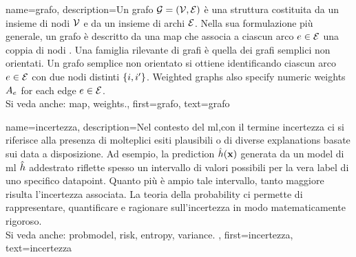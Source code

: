 {name={grafo},
	description={Un grafo $\mathcal{G} = \left( \mathcal{V},\mathcal{E} \right)$ è una struttura costituita da  
	un insieme di nodi $\mathcal{V}$ e da un insieme di archi $\mathcal{E}$. Nella sua formulazione più generale, 
	un grafo è descritto da una \gls{map} che associa a ciascun arco $e \in \mathcal{E}$ una coppia di nodi 
	\cite{RockNetworks}. 
		Una famiglia rilevante di grafi è quella dei grafi semplici non orientati. Un grafo semplice 
		non orientato si ottiene identificando ciascun arco $e \in \mathcal{E}$ con due nodi distinti $\{i,i'\}$. 
		Weighted graphs also specify numeric \gls{weights} $A_{e}$ for each 
		edge $e \in \mathcal{E}$.
					\\ 
		Si veda anche: \gls{map}, \gls{weights}.},
	first={grafo},
	text={grafo} 
}

{name={incertezza},
	description={Nel contesto del \gls{ml},con il termine incertezza ci si riferisce alla presenza di 
	molteplici esiti plausibili o di diverse \glspl{explanation} basate sui \gls{data} a disposizione. Ad esempio, la
		\gls{prediction} $\hat{h}({\bf x})$ generata da un \gls{model} di \gls{ml} 
		$\hat{h}$ addestrato riflette spesso un intervallo di valori possibili per la vera \gls{label} 
		di uno specifico \gls{datapoint}. 
	 	Quanto più è ampio tale intervallo, tanto maggiore risulta l’incertezza associata. La teoria della \gls{probability} 
	 	ci permette di rappresentare, quantificare e ragionare sull’incertezza in modo matematicamente rigoroso.					\\ 
		Si veda anche: \gls{probmodel}, \gls{risk}, \gls{entropy}, \gls{variance}. },
	first={incertezza},
	text={incertezza}
}


